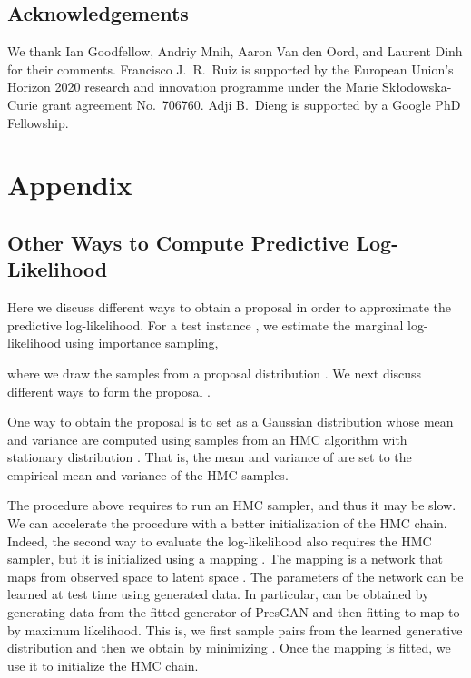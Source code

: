 \documentclass[11pt]{article}
\begin{document}
 
\subsection*{Acknowledgements}
We thank Ian Goodfellow, Andriy Mnih, Aaron Van den Oord, and Laurent Dinh for their comments. Francisco J.\ R.\ Ruiz is supported by the European Union's Horizon 2020 research and innovation programme under the Marie Sk\l{}odowska-Curie grant agreement No.\ 706760. Adji B.\ Dieng is supported by a Google PhD Fellowship.





\section*{Appendix}

\subsection{Other Ways to Compute Predictive Log-Likelihood}\label{app:proposals}

Here we discuss different ways to obtain a proposal in order to approximate the predictive log-likelihood.
For a test instance , we estimate the marginal log-likelihood  using importance sampling,

where we draw the  samples  from a proposal distribution . We next discuss different ways to form the proposal . 

One way to obtain the proposal is to set  as a Gaussian distribution whose mean and variance are computed using samples from an \acrshort{HMC} algorithm with stationary distribution . That is, the mean and variance of  are set to the empirical mean and variance of the \acrshort{HMC} samples.

The procedure above requires to run an \acrshort{HMC} sampler, and thus it may be slow. We can accelerate the procedure with a better initialization of the \acrshort{HMC} chain.
Indeed, the second way to evaluate the log-likelihood also requires the \acrshort{HMC} sampler, but
it is initialized using a mapping . 
The mapping  is a network that maps from observed space  to latent space . The parameters  of the network can be learned at test time using generated data. In particular,  can be obtained by generating data from the fitted generator of Pres\acrshort{GAN} and then fitting  to map  to  by maximum likelihood. This is, we first sample  pairs  from the learned generative distribution and then we obtain  by minimizing
.
Once the mapping is fitted, we use it to initialize the \acrshort{HMC} chain.
\end{document}
